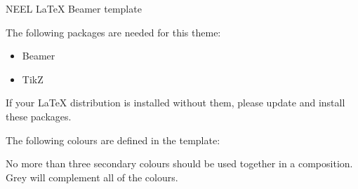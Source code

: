 \documentclass{beamer}
\begin{document}
\begin{frame}{NEEL {\LaTeX} Beamer template}

The following packages are needed for this theme:

\begin{itemize}
\item Beamer
\item TikZ
\end{itemize}

If your {\LaTeX} distribution is installed without them, please update and install these packages.

The following colours are defined in the template:
\begin{center}
\end{center}

No more than three secondary colours should be used together in a composition. Grey will complement all of the colours.

\end{frame}

\end{document}
